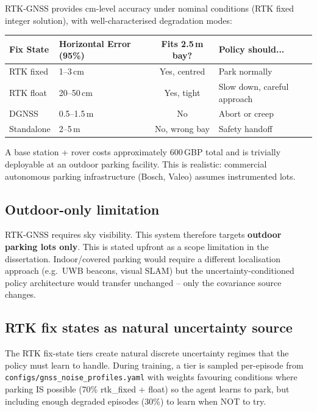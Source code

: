 \documentclass[11pt,a4paper]{article}
\begin{document}
RTK-GNSS provides cm-level accuracy under nominal conditions (RTK fixed
integer solution), with well-characterised degradation modes:

\begin{center}
\begin{tabular}{llcl}
\toprule
Fix State & Horizontal Error (95\%) & Fits 2.5\,m bay? & Policy should... \\
\midrule
RTK fixed     & 1--3\,cm   & Yes, centred & Park normally \\
RTK float     & 20--50\,cm & Yes, tight   & Slow down, careful approach \\
DGNSS         & 0.5--1.5\,m & No          & Abort or creep \\
Standalone    & 2--5\,m    & No, wrong bay & Safety handoff \\
\bottomrule
\end{tabular}
\end{center}

A base station + rover costs approximately 600\,GBP total and is trivially
deployable at an outdoor parking facility. This is realistic: commercial
autonomous parking infrastructure (Bosch, Valeo) assumes instrumented lots.

\subsection{Outdoor-only limitation}

RTK-GNSS requires sky visibility. This system therefore targets \textbf{outdoor
parking lots only}. This is stated upfront as a scope limitation in the
dissertation. Indoor/covered parking would require a different localisation
approach (e.g.\ UWB beacons, visual SLAM) but the uncertainty-conditioned
policy architecture would transfer unchanged -- only the covariance source
changes.

\subsection{RTK fix states as natural uncertainty source}

The RTK fix-state tiers create natural discrete uncertainty regimes that
the policy must learn to handle. During training, a tier is sampled
per-episode from \texttt{configs/gnss\_noise\_profiles.yaml} with weights
favouring conditions where parking IS possible (70\% rtk\_fixed + float)
so the agent learns to park, but including enough degraded episodes (30\%)
to learn when NOT to try.
\end{document}
